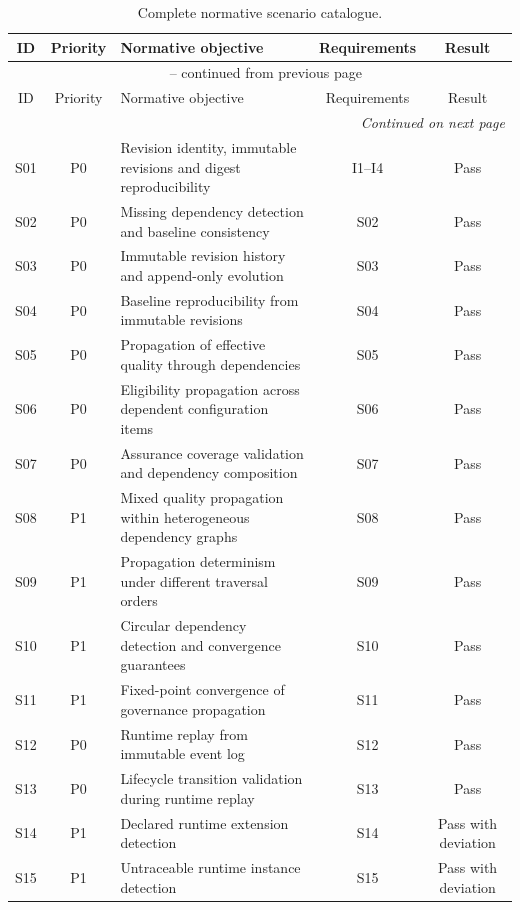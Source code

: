 \documentclass[10pt]{article}
\begin{document}
\begin{longtable}{ccp{8.5cm}cc}
	\caption{Complete normative scenario catalogue.}
	\label{tab:appendix_scenarios}\\
	\toprule
	ID & Priority & Normative objective & Requirements & Result \\
	\midrule
	\endfirsthead
	\multicolumn{5}{c}{\tablename\ \thetable{} -- continued from previous page} \\
	\toprule
	ID & Priority & Normative objective & Requirements & Result \\
	\midrule
	\endhead
	\midrule
	\multicolumn{5}{r}{\textit{Continued on next page}} \\
	\endfoot
	\bottomrule
	\endlastfoot
	
	S01 & P0 & Revision identity, immutable revisions and digest reproducibility & I1--I4 & Pass \\
	S02 & P0 & Missing dependency detection and baseline consistency & S02 & Pass \\
	S03 & P0 & Immutable revision history and append-only evolution & S03 & Pass \\
	S04 & P0 & Baseline reproducibility from immutable revisions & S04 & Pass \\
	S05 & P0 & Propagation of effective quality through dependencies & S05 & Pass \\
	S06 & P0 & Eligibility propagation across dependent configuration items & S06 & Pass \\
	S07 & P0 & Assurance coverage validation and dependency composition & S07 & Pass \\
	S08 & P1 & Mixed quality propagation within heterogeneous dependency graphs & S08 & Pass \\
	S09 & P1 & Propagation determinism under different traversal orders & S09 & Pass \\
	S10 & P1 & Circular dependency detection and convergence guarantees & S10 & Pass \\
	S11 & P1 & Fixed-point convergence of governance propagation & S11 & Pass \\
	S12 & P0 & Runtime replay from immutable event log & S12 & Pass \\
	S13 & P0 & Lifecycle transition validation during runtime replay & S13 & Pass \\
	S14 & P1 & Declared runtime extension detection & S14 & Pass with deviation \\
	S15 & P1 & Untraceable runtime instance detection & S15 & Pass with deviation \\

\end{longtable}
\end{document}
